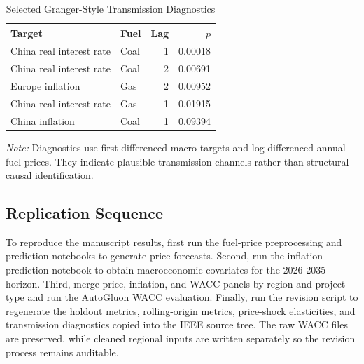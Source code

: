 \begin{table}[!ht]
\centering
\caption{Selected Granger-Style Transmission Diagnostics}
\label{tab:appendix-granger}
\scriptsize
\begin{tabular}{P{0.35\columnwidth}lrr}
\toprule
\textbf{Target} & \textbf{Fuel} & \textbf{Lag} & \textbf{$p$} \\
\midrule
China real interest rate & Coal & 1 & 0.00018 \\
China real interest rate & Coal & 2 & 0.00691 \\
Europe inflation & Gas & 2 & 0.00952 \\
China real interest rate & Gas & 1 & 0.01915 \\
China inflation & Coal & 1 & 0.09394 \\
\bottomrule
\end{tabular}
\vspace{2pt}

\raggedright\scriptsize
\textit{Note:} Diagnostics use first-differenced macro targets and log-differenced annual fuel prices. They indicate plausible transmission channels rather than structural causal identification.
\end{table}

\subsection{Replication Sequence}

To reproduce the manuscript results, first run the fuel-price preprocessing and prediction notebooks to generate price forecasts. Second, run the inflation prediction notebook to obtain macroeconomic covariates for the 2026-2035 horizon. Third, merge price, inflation, and WACC panels by region and project type and run the AutoGluon WACC evaluation. Finally, run the revision script to regenerate the holdout metrics, rolling-origin metrics, price-shock elasticities, and transmission diagnostics copied into the IEEE source tree. The raw WACC files are preserved, while cleaned regional inputs are written separately so the revision process remains auditable.
